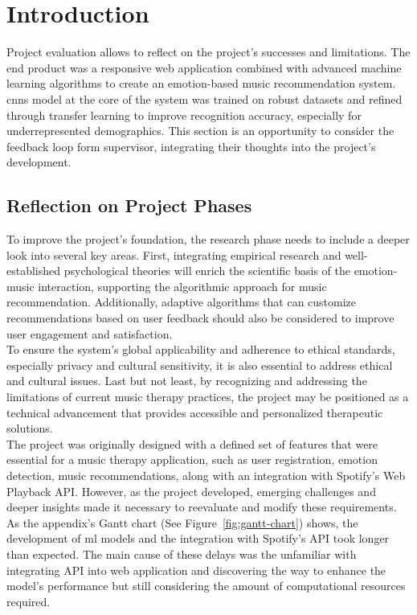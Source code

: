 \section{Introduction}
Project evaluation allows to reflect on the project's successes and limitations.
The end product was a responsive web application combined with advanced machine learning algorithms to create an emotion-based music recommendation system.
\gls{cnns} model at the core of the system was trained on robust datasets and refined through transfer learning to improve recognition accuracy, especially for underrepresented demographics.
This section is an opportunity to consider the feedback loop form supervisor, integrating their thoughts into the project's development.

\subsection{Reflection on Project Phases}
To improve the project's foundation, the research phase needs to include a deeper look into several key areas.
First, integrating empirical research and well-established psychological theories will enrich the scientific basis of the emotion-music interaction, supporting the algorithmic approach for music recommendation.
Additionally, adaptive algorithms that can customize recommendations based on user feedback should also be considered to improve user engagement and satisfaction.
\\
\indent To ensure the system's global applicability and adherence to ethical standards, especially privacy and cultural sensitivity, it is also essential to address ethical and cultural issues.
Last but not least, by recognizing and addressing the limitations of current music therapy practices, the project may be positioned as a technical advancement that provides accessible and personalized therapeutic solutions.
\\
\indent The project was originally designed with a defined set of features that were essential for a music therapy application, such as user registration, emotion detection, music recommendations, along with an integration with Spotify's Web Playback API.
However, as the project developed, emerging challenges and deeper insights made it necessary to reevaluate and modify these requirements.
As the appendix's Gantt chart (See Figure~\ref{fig:gantt-chart}) shows, the development of \gls{ml} models and the integration with Spotify's API took longer than expected. 
The main cause of these delays was the unfamiliar with integrating API into web application and discovering the way to enhance the model's performance but still considering the amount of computational resources required.
